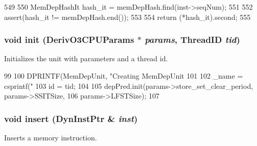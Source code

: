 \begin{DoxyCode}
549 {
550     MemDepHashIt hash_it = memDepHash.find(inst->seqNum);
551 
552     assert(hash_it != memDepHash.end());
553 
554     return (*hash_it).second;
555 }
\end{DoxyCode}
\hypertarget{classMemDepUnit_a0b3a45df958cbefd5455ff2aa1418bb4}{
\subsubsection[{init}]{\setlength{\rightskip}{0pt plus 5cm}void init (DerivO3CPUParams $\ast$ {\em params}, \/  {\bf ThreadID} {\em tid})}}
\label{classMemDepUnit_a0b3a45df958cbefd5455ff2aa1418bb4}
Initializes the unit with parameters and a thread id. 


\begin{DoxyCode}
99 {
100     DPRINTF(MemDepUnit, "Creating MemDepUnit %
101 
102     _name = csprintf("%
103     id = tid;
104 
105     depPred.init(params->store_set_clear_period, params->SSITSize,
106             params->LFSTSize);
107 }
\end{DoxyCode}
\hypertarget{classMemDepUnit_a773e88db1aa010c3755e603493bf40ec}{
\subsubsection[{insert}]{\setlength{\rightskip}{0pt plus 5cm}void insert ({\bf DynInstPtr} \& {\em inst})}}
\label{classMemDepUnit_a773e88db1aa010c3755e603493bf40ec}
Inserts a memory instruction. 


